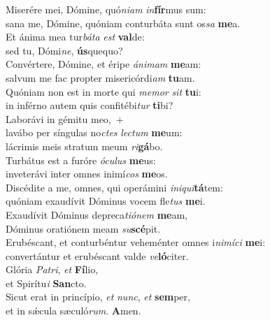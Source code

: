 \evenverse Miserére mei, Dómine, quó\textit{ni}\textit{am} \textit{in}\textbf{fír}mus sum:~\*\\
\evenverse sana me, Dómine, quóniam conturbáta sunt os\textit{sa} \textbf{me}a.\\
\oddverse Et ánima mea tur\textit{bá}\textit{ta} \textit{est} \textbf{val}de:~\*\\
\oddverse sed tu, Dómi\textit{ne}, \textbf{ús}quequo?\\
\evenverse Convértere, Dómine, et éripe \textit{á}\textit{ni}\textit{mam} \textbf{me}am:~\*\\
\evenverse salvum me fac propter misericórdi\textit{am} \textbf{tu}am.\\
\oddverse Quóniam non est in morte qui \textit{me}\textit{mor} \textit{sit} \textbf{tu}i:~\*\\
\oddverse in inférno autem quis confitébi\textit{tur} \textbf{ti}bi?\\
\evenverse Laborávi in gémitu meo,~+\\
\evenverse  lavábo per síngulas no\textit{ctes} \textit{le}\textit{ctum} \textbf{me}um:~\*\\
\evenverse lácrimis meis stratum meum \textit{ri}\textbf{gá}bo.\\
\oddverse Turbátus est a furóre \textit{ó}\textit{cu}\textit{lus} \textbf{me}us:~\*\\
\oddverse inveterávi inter omnes inimí\textit{cos} \textbf{me}os.\\
\evenverse Discédite a me, omnes, qui operámini \textit{i}\textit{ni}\textit{qui}\textbf{tá}tem:~\*\\
\evenverse quóniam exaudívit Dóminus vocem fle\textit{tus} \textbf{me}i.\\
\oddverse Exaudívit Dóminus depreca\textit{ti}\textit{ó}\textit{nem} \textbf{me}am,~\*\\
\oddverse Dóminus oratiónem meam \textit{su}\textbf{scé}pit.\\
\evenverse Erubéscant, et conturbéntur veheménter omnes i\textit{ni}\textit{mí}\textit{ci} \textbf{me}i:~\*\\
\evenverse convertántur et erubéscant valde \textit{ve}\textbf{ló}citer.\\
\oddverse Glória \textit{Pa}\textit{tri}, \textit{et} \textbf{Fí}lio,~\*\\
\oddverse et Spirítu\textit{i} \textbf{San}cto.\\
\evenverse Sicut erat in princípio, \textit{et} \textit{nunc}, \textit{et} \textbf{sem}per,~\*\\
\evenverse et in sǽcula sæculó\textit{rum}. \textbf{A}men.\\
